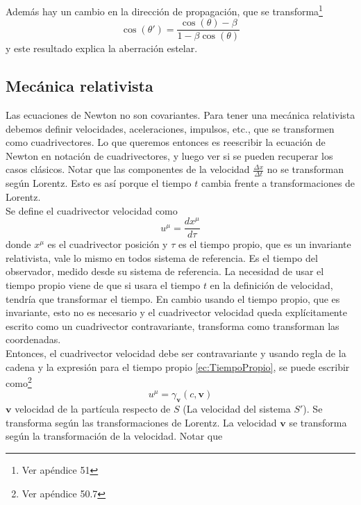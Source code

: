 Además hay un cambio en la dirección de propagación, que se transforma\footnote{Ver apéndice 51}
\begin{equation*}
    \cos{(\theta')} = \frac{\cos{(\theta)}-\beta}{1 - \beta\cos{(\theta)}}
\end{equation*}
y este resultado explica la aberración estelar.





\subsection{Mecánica relativista}

Las ecuaciones de Newton no son covariantes. Para tener una mecánica relativista debemos definir velocidades, aceleraciones, impulsos, etc., que se transformen como cuadrivectores. Lo que queremos entonces es reescribir la ecuación de Newton en notación de cuadrivectores, y luego ver si se pueden recuperar los casos clásicos. Notar que las componentes de la velocidad $\frac{\Delta x}{\Delta t}$ no se transforman según Lorentz. Esto es así porque el tiempo $t$ cambia frente a transformaciones de Lorentz.\\
\indent Se define el cuadrivector velocidad como 
\begin{equation*}
    u^{\mu} = \frac{dx^{\mu}}{d\tau}
\end{equation*}
donde $x^{\mu}$ es el cuadrivector posición y $\tau$ es el tiempo propio, que es un invariante relativista, vale lo mismo en todos sistema de referencia. Es el tiempo del observador, medido desde su sistema de referencia. La necesidad de usar el tiempo propio viene de que si usara el tiempo $t$ en la definición de velocidad, tendría que transformar el tiempo. En cambio usando el tiempo propio, que es invariante, esto no es necesario y el cuadrivector velocidad queda explícitamente escrito como un cuadrivector contravariante, transforma como transforman las coordenadas.\\
\indent Entonces, el cuadrivector velocidad debe ser contravariante y usando regla de la cadena y la expresión para el tiempo propio \eqref{ec:TiempoPropio}, se puede escribir como\footnote{Ver apéndice 50.7}
\begin{equation*}
    u^{\mu} = \gamma_{\textbf{v}}(c, \textbf{v})
\end{equation*}
$\textbf{v}$ velocidad de la partícula respecto de $S$ (La velocidad del sistema $S'$). Se transforma según las transformaciones de Lorentz. La velocidad $\textbf{v}$ se transforma según la transformación de la velocidad. Notar que
